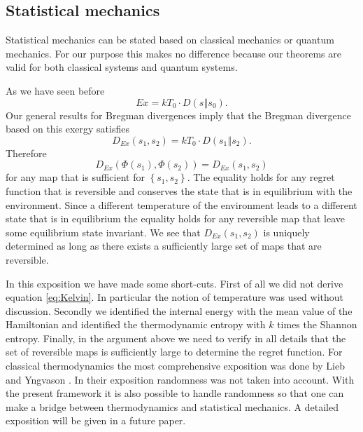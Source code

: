 \documentclass[10pt,a4paper,draft]{article}
\begin{document}
\subsection{Statistical mechanics}

Statistical mechanics can be stated based on classical mechanics
or quantum mechanics. For our purpose this makes no difference
because our theorems are valid for both classical systems and
quantum systems. 

As we have seen before 
\begin{equation}
Ex=kT_{0}\cdot D\left(s\left\Vert
s_{0}\right.\right).\label{eq:Kelvin}
\end{equation}
Our general results for Bregman divergences imply that the
Bregman divergence based on this exergy satisfies
\[
D_{Ex}\left(s_{1},s_{2}\right)=kT_{0}\cdot
D\left(s_{1}\left\Vert s_{2}\right.\right).
\]
Therefore 
\[
D_{Ex}\left(\Phi\left(s_{1}\right),\Phi\left(s_{2}\right)\right)=D_{Ex}\left(s_{1},s_{2}\right)
\]
for any map that is sufficient for $\left\{
s_{1},s_{2}\right\} .$
The equality holds for any regret function that is reversible
and conserves the state that is in equilibrium with the environment.
Since a different temperature of the environment leads to a different
state that is in equilibrium the equality holds for any reversible
map that leave some equilibrium state invariant. We see that
$D_{Ex}\left(s_{1},s_{2}\right)$ is uniquely determined as long as there exists a sufficiently
large set of maps that are reversible.

In this exposition we have made some short-cuts. First of all we
did not derive equation \ref{eq:Kelvin}. In particular the notion of temperature
was used without discussion. Secondly we identified the internal
energy with the mean value of the Hamiltonian and identified the
thermodynamic entropy with $k$ times the Shannon entropy. Finally, in the
argument above we need to verify in all details that the set of
reversible maps is sufficiently large to determine the regret
function. For classical thermodynamics the most comprehensive exposition
was done by Lieb and Yngvason \cite{Lieb1998,Lieb2010}. In their
exposition randomness was not taken into account. With the present framework it is
also possible to handle randomness so that one can make a bridge between thermodynamics and
statistical mechanics. A detailed exposition will be given in a future
paper.
\end{document}
